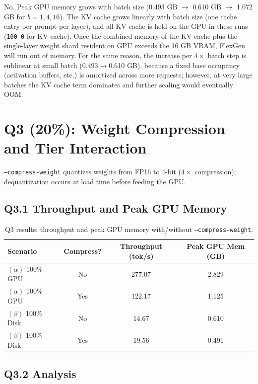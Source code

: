 \documentclass[12pt,a4paper]{article}
\begin{document}
No. Peak GPU memory grows with batch size (0.493 GB $\to$ 0.610 GB $\to$ 1.072 GB for $b=1,4,16$).
The KV cache grows linearly with batch size (one cache entry per prompt per layer), and all KV cache is held on the GPU in these runs (\texttt{100 0} for KV cache).
Once the combined memory of the KV cache plus the single-layer weight shard resident on GPU exceeds the 16 GB VRAM, FlexGen will run out of memory.
For the same reason, the increase per $4\times$ batch step is sublinear at small batch (0.493$\to$0.610 GB), because a fixed base occupancy (activation buffers, etc.) is amortized across more requests; however, at very large batches the KV cache term dominates and further scaling would eventually OOM.

\newpage

\section{Q3 (20\%): Weight Compression and Tier Interaction}

\texttt{--compress-weight} quantizes weights from FP16 to 4-bit ($4\times$ compression); dequantization occurs at load time before feeding the GPU.

\subsection*{Q3.1 Throughput and Peak GPU Memory}

\begin{table}[H]
\centering
\caption{Q3 results: throughput and peak GPU memory with/without \texttt{--compress-weight}.}
\begin{tabular}{lccc}
\toprule
\textbf{Scenario} & \textbf{Compress?} & \textbf{Throughput (tok/s)} & \textbf{Peak GPU Mem (GB)} \\
\midrule
$(\alpha)$ 100\% GPU  & No  & 277.07 & 2.829 \\
$(\alpha)$ 100\% GPU  & Yes & 122.17 & 1.125 \\
$(\beta)$ 100\% Disk  & No  &  14.67 & 0.610 \\
$(\beta)$ 100\% Disk  & Yes &  19.56 & 0.491 \\
\bottomrule
\end{tabular}
\end{table}

\subsection*{Q3.2 Analysis}
\end{document}
